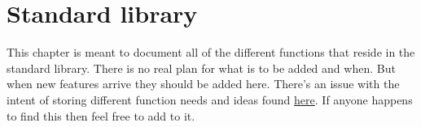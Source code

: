 
\section{Standard library}

This chapter is meant to document all of the different functions that reside in the standard library. 
There is no real plan for what is to be added and when. 
But when new features arrive they should be added here. 
There's an issue with the intent of storing different function needs and ideas found \href{https://github.com/AntonJoha/Lisp/issues/11}{here}.
If anyone happens to find this then feel free to add to it. 

